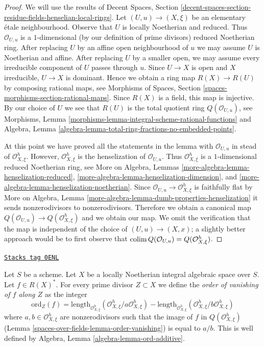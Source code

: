 \begin{proof}
We will use the results of Decent Spaces, Section
\ref{decent-spaces-section-residue-fields-henselian-local-rings}.
Let $(U, u) \to (X, \xi)$ be an elementary \'etale neighbourhood.
Observe that $U$ is locally Noetherian and reduced.
Thus $\mathcal{O}_{U, u}$ is a $1$-dimensional
(by our definition of prime divisors)
reduced Noetherian ring.
After replacing $U$ by an affine open neighbourhood of $u$
we may assume $U$ is Noetherian and affine.
After replacing $U$ by a smaller open, we may assume every irreducible
component of $U$ passes through $u$.
Since $U \to X$ is open and $X$ irreducible, $U \to X$ is dominant.
Hence we obtain a ring map $R(X) \to R(U)$ by composing rational maps, see
Morphisms of Spaces, Section \ref{spaces-morphisms-section-rational-maps}.
Since $R(X)$ is a field, this map is injective.
By our choice of $U$ we see that $R(U)$ is the total quotient
ring $Q(\mathcal{O}_{U, u})$, see
Morphisms, Lemma \ref{morphisms-lemma-integral-scheme-rational-functions}
and
Algebra, Lemma \ref{algebra-lemma-total-ring-fractions-no-embedded-points}.

\medskip\noindent
At this point we have proved all the statements in the lemma with
$\mathcal{O}_{U, u}$ in stead of $\mathcal{O}_{X, \xi}^h$.
However, $\mathcal{O}_{X, \xi}^h$ is the henselization of
$\mathcal{O}_{U, u}$. Thus $\mathcal{O}_{X, \xi}^h$ is a $1$-dimensional
reduced Noetherian ring, see
More on Algebra, Lemmas
\ref{more-algebra-lemma-henselization-reduced},
\ref{more-algebra-lemma-henselization-dimension}, and
\ref{more-algebra-lemma-henselization-noetherian}.
Since $\mathcal{O}_{U, u} \to \mathcal{O}_{X, \xi}^h$ is
faithfully flat by More on Algebra, Lemma
\ref{more-algebra-lemma-dumb-properties-henselization}
it sends nonzerodivisors to nonzerodivisors.
Therefore we obtain a canonical map
$Q(\mathcal{O}_{U, u}) \to Q(\mathcal{O}_{X, \xi}^h)$
and we obtain our map.
We omit the verification that the map is independent of
the choice of $(U, u) \to (X, x)$; a slightly better
approach would be to first observe that
$\operatorname{colim} Q(\mathcal{O}_{U, u}) = Q(\mathcal{O}_{X, \xi}^h)$.
\end{proof}

\begin{definition}
\label{spaces-over-fields-definition-order-vanishing}
\href{https://stacks.math.columbia.edu/tag/0ENL}{\texttt{Stacks tag 0ENL}}

Let $S$ be a scheme. Let $X$ be a locally Noetherian integral algebraic
space over $S$. Let $f \in R(X)^*$. For every prime divisor
$Z \subset X$ we define the {\it order of vanishing of $f$ along $Z$}
as the integer
$$
\text{ord}_Z(f) =
\text{length}_{\mathcal{O}_{X, \xi}^h}
(\mathcal{O}_{X, \xi}^h/a \mathcal{O}_{X, \xi}^h) -
\text{length}_{\mathcal{O}_{X, \xi}^h}
(\mathcal{O}_{X, \xi}^h/b \mathcal{O}_{X, \xi}^h)
$$
where $a, b \in \mathcal{O}_{X, \xi}^h$ are nonzerodivisors
such that the image of $f$ in $Q(\mathcal{O}_{X, \xi}^h)$
(Lemma \ref{spaces-over-fields-lemma-order-vanishing}) is equal to $a/b$.
This is well defined by
Algebra, Lemma \ref{algebra-lemma-ord-additive}.
\end{definition}

